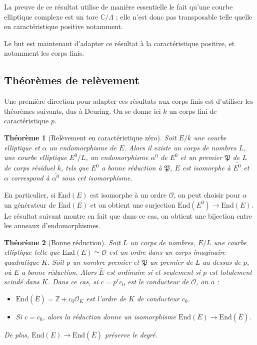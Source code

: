 \documentclass[11pt,a4paper]{article}
\newcommand{\Z}{\mathbb{Z}}
\newcommand{\C}{\mathbb{C}}
\renewcommand{\O}{\mathcal{O}}
\newcommand{\vers}{\rightarrow}
\newcommand{\End}{\mathrm{End}}
\renewcommand{\frak}{\mathfrak}
\newtheorem{thm}{Théorème}[subsection]
\theoremstyle{definition}
\begin{document}
La preuve de ce résultat utilise de manière essentielle le fait qu'une courbe elliptique complexe est un tore $\C/\Lambda$ ; elle n'est donc pas transposable telle quelle en caractéristique positive notamment.

Le but est maintenant d'adapter ce résultat à la caractéristique positive, et notamment les corps finis.




\subsection{Théorèmes de relèvement}


Une première direction pour adapter ces résultats aux corps finis est d'utiliser les théorèmes suivants, dus à Deuring. On se donne ici $k$ un corps fini de caractéristique $p$.


\begin{thm}[Relèvement en caractéristique zéro]

Soit $E/k$ une courbe elliptique et $\alpha$ un endomorphisme de $E$. Alors il existe un corps de nombres $L$, une courbe elliptique $E^0/L$, un endomorphisme $\alpha^0$ de $E^0$ et un premier $\frak P$ de $L$ de corps résiduel $k$, tels que $E^0$ a bonne réduction à $\frak P$, $E$ est isomorphe à $\bar{E^0}$ et $\alpha$ correspond à $\bar{\alpha^0}$ sous cet isomorphisme.

\end{thm}

En particulier, si $\End(E)$ est isomorphe à un ordre $\O$, on peut choisir pour $\alpha$ un générateur de $\End(E)$ et on obtient une surjection $\End(E^0)\vers \End(E).$ Le résultat suivant montre en fait que dans ce cas, on obtient une bijection entre les anneaux d'endomorphismes.

\begin{thm}[Bonne réduction]

Soit $L$ un corps de nombres, $E/L$ une courbe elliptique telle que $\End(E)\simeq \O$ est un ordre dans un corps imaginaire quadratique $K$. Soit $p$ un nombre premier et $\frak P$ un premier de $L$ au-dessus de $p$, où $E$ a bonne réduction. Alors $\bar{E}$ est ordinaire si et seulement si $p$ est totalement scindé dans $K$. Dans ce cas, si $c=p^r c_0$ est le conducteur de $\O$, on a :

\begin{itemize}
\item[(i)] $\End(\bar{E})=\Z+c_0 \O_K$ est l'ordre de $K$ de conducteur $c_0$.
\item[(ii)] Si $c=c_0$, alors la réduction donne un isomorphisme $\End(E)\vers\End(\bar{E})$.
\end{itemize}

De plus, $\End(E)\vers\End(\bar{E})$ préserve le degré.

\end{thm}
\end{document}
